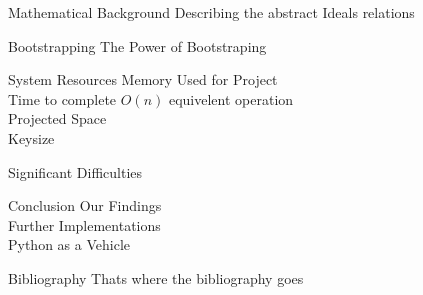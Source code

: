 \documentclass[a0,portrait]{a0poster}
\begin{document}
\begin{multicols}{3}
\begin{slide}{Mathematical Background}
Describing the abstract Ideals relations
\end{slide}

\begin{slide}{Bootstrapping}
The Power of Bootstraping
\end{slide}

\begin{slide}{System Resources}
Memory Used for Project \\ Time to complete \(O(n)\) equivelent operation \\ Projected Space \\ Keysize 
\end{slide}

\begin{slide}{Significant Difficulties}

\end{slide}

\begin{slide}{Conclusion}
Our Findings \\ Further Implementations \\ Python as a Vehicle
\end{slide}

\begin{slide}{Bibliography}
Thats where the bibliography goes
\end{slide}
\end{multicols}
\end{document}
